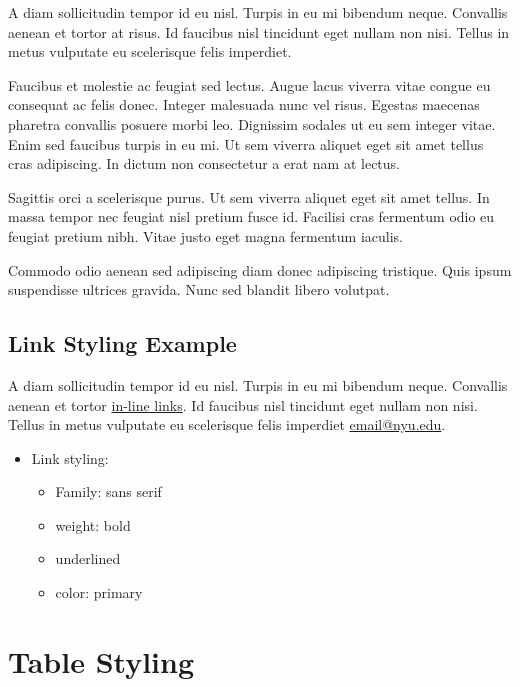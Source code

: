 \documentclass{nyu22report}
\begin{document}
A diam sollicitudin tempor id eu nisl. Turpis in eu mi bibendum neque. Convallis
aenean et tortor at risus. Id faucibus nisl tincidunt eget nullam non nisi.
Tellus in metus vulputate eu scelerisque felis imperdiet.

Faucibus et molestie ac feugiat sed lectus. Augue lacus viverra vitae congue eu
consequat ac felis donec. Integer malesuada nunc vel risus. Egestas maecenas
pharetra convallis posuere morbi leo. Dignissim sodales ut eu sem integer vitae.
Enim sed faucibus turpis in eu mi. Ut sem viverra aliquet eget sit amet tellus
cras adipiscing. In dictum non consectetur a erat nam at lectus.

Sagittis orci a scelerisque purus. Ut sem viverra aliquet eget sit amet tellus.
In massa tempor nec feugiat nisl pretium fusce id. Facilisi cras fermentum odio
eu feugiat pretium nibh. Vitae justo eget magna fermentum iaculis.

Commodo odio aenean sed adipiscing diam donec adipiscing tristique. Quis ipsum
suspendisse ultrices gravida. Nunc sed blandit libero volutpat.

\section{Link Styling Example}

A diam sollicitudin tempor id eu nisl. Turpis in eu mi bibendum neque. Convallis
aenean et tortor \href{https://www.nyu.edu/}{in-line links}. Id faucibus nisl
tincidunt eget nullam non nisi. Tellus in metus vulputate eu scelerisque felis
imperdiet \href{mailto:email@nyu.edu}{email@nyu.edu}. 

\begin{itemize}
    \item Link styling:
    \begin{itemize}
        \item Family: sans serif
        \item weight: bold
        \item underlined
        \item color: primary
    \end{itemize}
\end{itemize}

\chapter{Table Styling}
\end{document}
